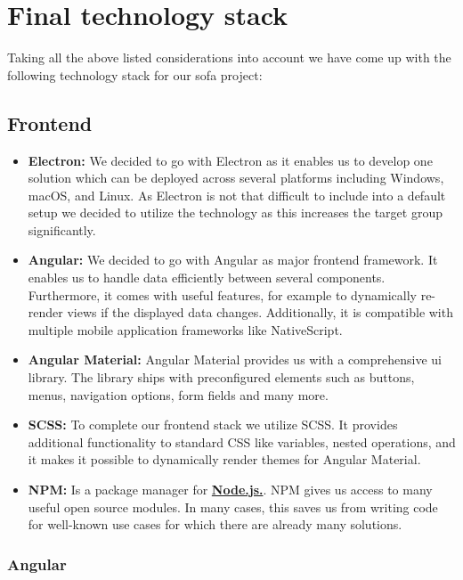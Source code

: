 \section{Final technology stack}\label{sec:final-technology-stack}

Taking all the above listed considerations into account we have come up with the following technology stack for our
\ac{sofa} project:

\subsection{Frontend}\label{subsec:frontend}

\begin{itemize}
    \item \textbf{Electron:} We decided to go with Electron as it enables us to develop one solution which can be
        deployed across several platforms including Windows, macOS, and Linux.
        As Electron is not that difficult to include into a default setup we decided to utilize the technology as this
        increases the target group significantly.
    \item \textbf{Angular:} We decided to go with Angular as major frontend framework.
        It enables us to handle data efficiently between several components.
        Furthermore, it comes with useful features, for example to dynamically re-render views if the displayed data
        changes.
        Additionally, it is compatible with multiple mobile application frameworks like NativeScript.
    \item \textbf{Angular Material:} Angular Material provides us with a comprehensive \ac{ui} library.
        The library ships with preconfigured elements such as buttons, menus, navigation options, form fields and many
        more.
    \item \textbf{SCSS:} To complete our frontend stack we utilize SCSS. It provides additional functionality to
        standard CSS like variables, nested operations, and it makes it possible to dynamically render themes for
        Angular Material.
    \item \textbf{NPM:} Is a package manager for \hyperref[subsec:backend]{\textbf{Node.js.}}.
        NPM gives us access to many useful open source modules.
        In many cases, this saves us from writing code for well-known use cases for which there are already many
        solutions.
\end{itemize}

\subsubsection{Angular}

